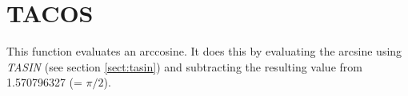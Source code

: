 \section{TACOS}
\label{sect:tacos}

\noindent This function evaluates an arccosine. It does this by evaluating the
arcsine using {\em TASIN} (see section \ref{sect:tasin}) and subtracting the
resulting value from 1.570796327 (= $\pi/2$).\\

